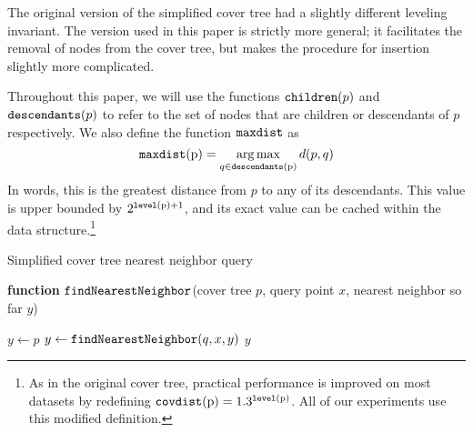 \documentclass[../main.tex]{subfiles}
\newcommand{\dist}[2]{\distf({#1},{#2})}
\newcommand{\distf}{d}
\newcommand{\p}{\ensuremath p}
\newcommand{\level}[1]{\ensuremath{\textup{\text{\ttfamily level}({#1})}}}
\newcommand{\children}[1]{\ensuremath{\textup{\text{\ttfamily children}({#1})}}}
\newcommand{\covdist}[1]{\ensuremath{\textup{\text{\ttfamily covdist}({#1})}}}
\newcommand{\descendants}[1]{\ensuremath{\textup{\text{\ttfamily descendants}({#1})}}}
\newcommand{\maxdist}[1]{\ensuremath{\textup{\text{\ttfamily maxdist}({#1})}}}
\newcommand{\findnn}{\ensuremath{\text{\ttfamily findNearestNeighbor}}}
\newcommand{\mkfunction}[1]{\ensuremath{\text{\ttfamily {#1}}}}
\begin{document}
\begin{remark}
    The original version of the simplified cover tree had a slightly different leveling invariant.
    The version used in this paper is strictly more general;
    it facilitates the removal of nodes from the cover tree,
    but makes the procedure for insertion slightly more complicated.
\end{remark}

Throughout this paper, we will use the functions $\children\p$ and $\descendants\p$ to refer to the set of nodes that are children or descendants of $p$ respectively.
We also define the function \mkfunction{maxdist} as
$$
\maxdist p = \argmax_{q\in\descendants{p}} \dist p q
$$
In words, this is the greatest distance from $p$ to any of its descendants.
This value is upper bounded by $2^{\level{p}+1}$, and its exact value can be cached within the data structure.\footnote{
    As in the original cover tree, practical performance is improved on most datasets by redefining $\covdist p = 1.3 ^ {\level p}$.
    All of our experiments use this modified definition.
}


\begin{algorithm}[H]
    \caption{Simplified cover tree nearest neighbor query}
    \label{alg:query}

    \vspace{0.1in}
{\bfseries function} \findnn(cover tree $p$, query  point $x$, nearest neighbor so far $y$)

\begin{algorithmic}[1]
        \State $y \leftarrow p$
    \EndIf
        \If {$d(y,x) > d(y,q) - \maxdist{q}$} %
            \State $y \leftarrow \findnn(q,x,y)$
        \EndIf
    \EndFor
    \State\Return $y$
\end{algorithmic}
\end{algorithm}

\end{document}
